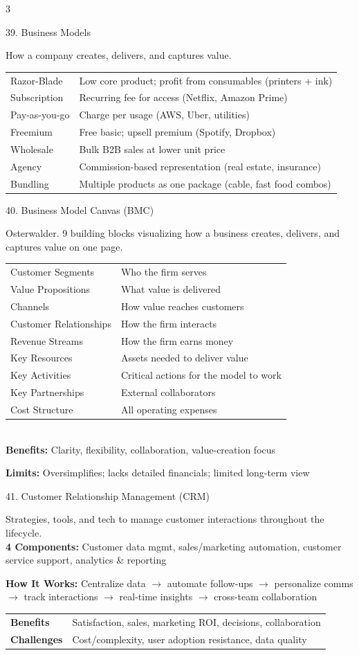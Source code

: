 \documentclass[7.5pt, letterpaper]{article}
\newcommand{\concept}[1]{%
  \vspace{2.5pt}%
  \noindent\colorbox{accent}{\parbox{\dimexpr\linewidth-2\fboxsep}{\fontsize{6.8pt}{7.5pt}\selectfont\bfseries\color{white}\strut #1\strut}}%
  \vspace{1pt}\par%
}
\newcommand{\kv}[2]{\noindent\textbf{#1:} #2\par}
\newcommand{\minitab}[1]{%
  \begingroup
  \fontsize{6.2pt}{7pt}\selectfont
  \setlength{\tabcolsep}{2pt}
  #1
  \endgroup
}
\begin{document}
\begin{multicols}{3}
\concept{39. Business Models}
How a company creates, delivers, and captures value.\\
\minitab{\begin{tabular}{@{}ll@{}}
Razor-Blade & Low core product; profit from consumables (printers + ink)\\
Subscription & Recurring fee for access (Netflix, Amazon Prime)\\
Pay-as-you-go & Charge per usage (AWS, Uber, utilities)\\
Freemium & Free basic; upsell premium (Spotify, Dropbox)\\
Wholesale & Bulk B2B sales at lower unit price\\
Agency & Commission-based representation (real estate, insurance)\\
Bundling & Multiple products as one package (cable, fast food combos)\\
\end{tabular}}

\concept{40. Business Model Canvas (BMC)}
Osterwalder. 9 building blocks visualizing how a business creates, delivers, and captures value on one page.\\
\minitab{\begin{tabular}{@{}ll@{}}
Customer Segments & Who the firm serves\\
Value Propositions & What value is delivered\\
Channels & How value reaches customers\\
Customer Relationships & How the firm interacts\\
Revenue Streams & How the firm earns money\\
Key Resources & Assets needed to deliver value\\
Key Activities & Critical actions for the model to work\\
Key Partnerships & External collaborators\\
Cost Structure & All operating expenses\\
\end{tabular}}\\
\kv{Benefits}{Clarity, flexibility, collaboration, value-creation focus}
\kv{Limits}{Oversimplifies; lacks detailed financials; limited long-term view}

\concept{41. Customer Relationship Management (CRM)}
Strategies, tools, and tech to manage customer interactions throughout the lifecycle.\\
\kv{4 Components}{Customer data mgmt, sales/marketing automation, customer service support, analytics \& reporting}
\kv{How It Works}{Centralize data $\to$ automate follow-ups $\to$ personalize comms $\to$ track interactions $\to$ real-time insights $\to$ cross-team collaboration}
\minitab{\begin{tabular}{@{}ll@{}}
\textbf{Benefits} & Satisfaction, sales, marketing ROI, decisions, collaboration\\
\textbf{Challenges} & Cost/complexity, user adoption resistance, data quality\\
\end{tabular}}


\end{multicols}
\end{document}
